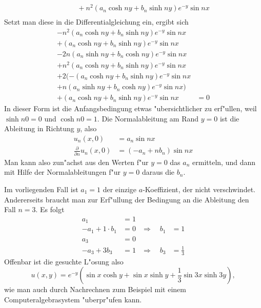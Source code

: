 \begin{loesung}
\begin{align*}
&\qquad
+n^2(a_n\cosh ny+b_n\sinh ny)e^{-y}\sin nx
\\
\end{align*}
Setzt man diese in die Differentialgleichung
ein, ergibt sich
\begin{align*}
-n^2 (a_n\cosh ny+b_n\sinh ny)e^{-y}\sin nx&\\
+(a_n\cosh ny+b_n\sinh ny)e^{-y}\sin nx&\\
-2n(a_n\sinh ny+b_n\cosh ny)e^{-y}\sin nx&\\
+n^2(a_n\cosh ny+b_n\sinh ny)e^{-y}\sin nx&\\
+2(
-(a_n\cosh ny+b_n\sinh ny)e^{-y}\sin nx&\\
+
n(a_n\sinh ny+b_n\cosh ny)e^{-y}\sin nx
)&\\
+
(a_n\cosh ny+b_n\sinh ny)e^{-y}\sin nx
&=0
\end{align*}
In dieser Form ist die Anfangsbedingung etwas "ubersichtlicher
zu erf"ullen, weil  $\sinh n0=0$ und $\cosh n0=1$. Die Normalableitung
am Rand $y=0$ ist die Ableitung in Richtung $y$, also
\begin{align*}
u_n(x,0)&=a_n\sin nx
\\
\frac{\partial}{\partial n}u_n(x,0)&=(-a_n+nb_n)\sin nx
\end{align*}
Man kann also zun"achst aus den Werten f"ur $y=0$ das $a_n$
ermitteln, und dann mit Hilfe der Normalableitungen f"ur $y=0$
daraus die $b_n$.

Im vorliegenden Fall ist $a_1=1$ der einzige $a$-Koeffizient,
der nicht verschwindet. Andererseits braucht man zur Erf"ullung
der Bedingung an die Ableitung den Fall $n=3$. Es folgt
\begin{align*}
a_1&=1&&\\
-a_1+1\cdot b_1&=0&\Rightarrow\quad b_1&=1\\
a_3&=0&&\\
-a_3+3b_3&=1&\Rightarrow\quad b_3&=\frac13
\end{align*}
Offenbar ist die gesuchte L"osung also
\[
u(x,y)=e^{-y}(\sin x \cosh y +
\sin x\sinh y
+
\frac13\sin 3x \sinh 3y),
\]
wie man auch durch Nachrechnen zum Beispiel mit einem Computeralgebrasystem
"uberpr"ufen kann.
\end{loesung}

